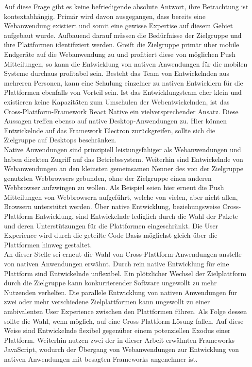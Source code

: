 \documentclass[a4paper]{scrartcl}
\begin{document}
Auf diese Frage gibt es keine befriedigende absolute Antwort, ihre Betrachtung ist kontextabhängig. Primär wird davon ausgegangen, dass bereits eine Webanwendung existiert und somit eine gewisse Expertise auf diesem Gebiet aufgebaut wurde. Aufbauend darauf müssen die Bedürfnisse der Zielgruppe und ihre Plattformen identifiziert werden. Greift die Zielgruppe primär über mobile Endgeräte auf die Webanwendung zu und profitiert diese von möglichen Push Mitteilungen, so kann die Entwicklung von nativen Anwendungen für die mobilen Systeme durchaus profitabel sein. Besteht das Team von Entwickelnden aus mehreren Personen, kann eine Schulung einzelner zu nativen Entwicklern für die Plattformen ebenfalls von Vorteil sein. Ist das Entwicklungsteam eher klein und existieren keine Kapazitäten zum Umschulen der Webentwickelnden, ist das Cross-Plattform-Framework React Native ein vielversprechender Ansatz. Diese Aussagen treffen ebenso auf native Desktop-Anwendungen zu. Hier können Entwickelnde auf das Framework Electron zurückgreifen, sollte sich die Zielgruppe auf Desktops beschränken. \\
Native Anwendungen sind prinzipiell leistungsfähiger als Webanwendungen und haben direkten Zugriff auf das Betriebssystem. Weiterhin sind Entwickelnde von Webanwendungen an den kleinsten gemeinsamen Nenner des von der Zielgruppe genutzten Webbrowsers gebunden, ohne der Zielgruppe einen anderen Webbrowser aufzwingen zu wollen. Als Beispiel seien hier erneut die Push Mitteilungen von Webbrowsern aufgeführt, welche von vielen, aber nicht allen, Browsern unterstützt werden. Über native Entwicklung, beziehungsweise Cross-Plattform-Entwicklung, sind Entwickelnde lediglich durch die Wahl der Pakete und deren Unterstützungen für die Plattformen eingeschränkt. Die User Experience wird durch die geteilte Code-Basis möglichst gleich über die Plattformen hinweg gestaltet. \\
An dieser Stelle sei erneut die Wahl von Cross-Plattform-Anwendungen anstelle von nativen Anwendungen erwähnt. Durch rein native Entwicklung für eine Plattform sind Entwickelnde unflexibel. Ein plötzlicher Wechsel der Zielplattform durch die Zielgruppe kann konkurrierender Software ungewollt zu mehr Nutzenden verhelfen. Die parallele Entwicklung von nativen Anwendungen für zwei oder mehr verschiedene Zielplattformen kann ungewollt zu einer ambivalenten User Experience zwischen den Plattformen führen. Als Folge dessen sollte die Wahl, wenn möglich, auf eine Cross-Plattform-Lösung fallen. Auf diese Weise sind Entwickelnde flexibel gegenüber einem potenziellen Exodus einer Plattform. Weiterhin nutzen zwei der in dieser Arbeit erwähnten Frameworks JavaScript, wodurch der Übergang von Webanwendungen zur Entwicklung von nativen Anwendungen mit besagten Frameworks angenehmer ist. \\
\end{document}
